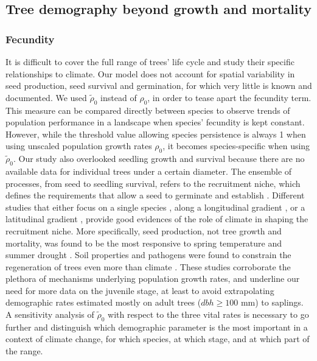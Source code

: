 \subsection{Tree demography beyond growth and mortality}
\subsubsection{Fecundity}
It is difficult to cover the full range of trees' life cycle and study their specific relationships to climate. Our model does not account for spatial variability in seed production, seed survival and germination, for which very little is known and documented. We used $ \tilde \rho_0 $ instead of $ \rho_0 $, in order to tease apart the fecundity term. This measure can be compared directly between species to observe trends of population performance in a landscape when species' fecundity is kept constant. However, while the threshold value allowing species persistence is always 1 when using unscaled population growth rates $ \rho_0 $, it becomes species-specific when using $ \tilde \rho_0 $. Our study also overlooked seedling growth and survival because there are no available data for individual trees under a certain diameter. The ensemble of processes, from seed to seedling survival, refers to the recruitment niche, which defines the requirements that allow a seed to germinate and establish \citep{Valdez2019}. Different studies that either focus on a single species \citep[\textit{Acer saccharum}]{Solarik2016}, along a longitudinal gradient \citep{CLARK2011}, or a latitudinal gradient \citep{Boisvert-Marsh2019}, provide good evidences of the role of climate in shaping the recruitment niche. More specifically, seed production, not tree growth and mortality, was found to be the most responsive to spring temperature and summer drought \citep[11 sites in the Appalachians, Piedmont, and North Carolina]{CLARK2011}. Soil properties and pathogens were found to constrain the regeneration of trees even more than climate \citep[Mont M\'{e}gantic, Qu\'{e}bec]{Brown2014}. These studies corroborate the plethora of mechanisms underlying population growth rates, and underline our need for more data on the juvenile stage, at least to avoid extrapolating demographic rates estimated mostly on adult trees ($ dbh \geqslant 100 $ mm) to saplings. A sensitivity analysis of $ \tilde \rho_0 $ with respect to the three vital rates is necessary to go further and distinguish which demographic parameter is the most important in a context of climate change, for which species, at which stage, and at which part of the range.

